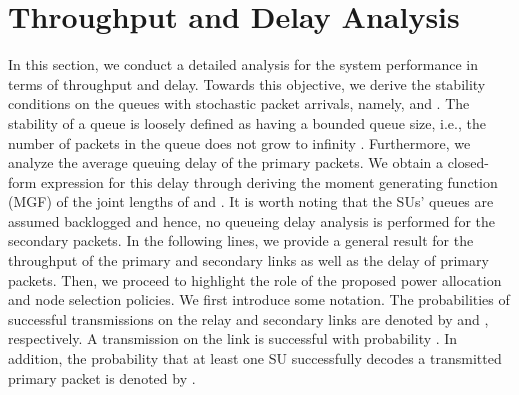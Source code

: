 \documentclass[journal,twocolumn]{IEEEtran}
\begin{document}
\section{Throughput and Delay Analysis}
\label{sect:analysis}
In this section, we conduct a detailed analysis for the system performance in terms of throughput and delay. Towards this objective, we derive
the stability conditions on the queues with stochastic packet arrivals, namely,  and . The stability of a queue is loosely defined as
having a bounded queue size, i.e., the number of packets in the queue does not grow to infinity \cite{sadek}. Furthermore, we analyze the average queuing delay of the primary packets. We obtain a closed-form expression for this delay through deriving the moment generating function (MGF) of the joint lengths of  and . It is worth noting that the SUs' queues are assumed backlogged and hence, no queueing delay analysis is performed for the secondary packets. In the following lines, we provide a general result for the throughput of the primary and secondary links as well as the delay of primary packets.
Then, we proceed to highlight the role of the proposed power allocation and node selection policies.
We first introduce some notation. The probabilities of successful transmissions on the relay and secondary links are denoted by  and , respectively. A transmission on the link  is successful with probability . In addition, the probability that at least one SU successfully decodes a transmitted primary packet is denoted by . 
\end{document}
